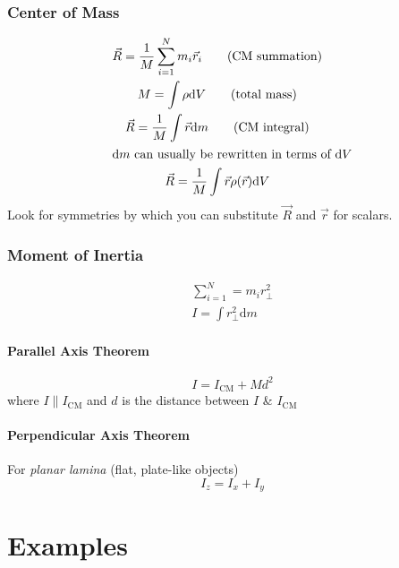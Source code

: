 \documentclass{cheatsheet}
\begin{document}
	\section{Center of Mass}
	\begin{gather*}
		\vec R = \frac{1}{M}\sum_{i=1}^N m_i \vec r_i	\tag{CM summation}\raisetag{-10pt}\\
		M = \int \rho \mathrm{d}V	\tag{total mass}\\
		\vec R =  \frac{1}{M}  \int \vec r \mathrm{d}m \tag{CM integral}\raisetag{-6pt}\\
	\intertext{$\mathrm{d}m$ can usually be rewritten in terms of $\mathrm{d}V$}
		\vec R = \frac{1}{M} \int \vec r \rho(\vec r) \mathrm{d}V
	\end{gather*}
	Look for symmetries by which you can substitute $\vec R$ and $\vec r$ for scalars.

	\section{Moment of Inertia}
	\begin{gather*}
		\sum_{i=1}^{N} = m_i r^2_\perp \tag{summation}\\
		I = \int r^2_\perp \mathrm{d}m	\tag{integral}
	\end{gather*}
		\subsection{Parallel Axis Theorem}
			\[ I = I_\mathrm{CM} + Md^2 \]
			where $I \parallel I_\mathrm{CM}$ and $d$ is the distance between $I$ \& $I_\mathrm{CM}$

		\subsection{Perpendicular Axis Theorem}
			For \emph{planar lamina} (flat, plate-like objects)
			\[ I_z = I_x + I_y \]

	
	\part*{Examples}
\end{document}
